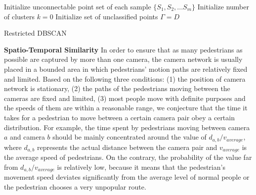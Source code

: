 \documentclass[10pt,twocolumn,letterpaper]{article}
\begin{document}
\begin{algorithm}
    \SetAlgoLined
        Initialize unconnectable point set of each sample $\{S_1, S_2, ... S_m\}$\;
        Initialize number of clusters $k = 0$\;
        Initialize set of unclassified points $\Gamma = D$\;
        \caption{Restricted DBSCAN}
    \label{alg:rdbscan}
\end{algorithm}

\noindent \textbf{Spatio-Temporal Similarity}
In order to ensure that as many pedestrians as possible are captured by more than one camera, the camera network is usually placed in a bounded area in which pedestrians' motion paths are relatively fixed and limited. Based on the following three conditions: (1) the position of camera network is stationary, (2) the paths of the pedestrians moving between the cameras are fixed and limited, (3) most people move with definite purposes and the speeds of them are within a reasonable range, we conjecture that the time it takes for a pedestrian to move between a certain camera pair obey a certain distribution. For example, the time spent by pedestrians moving between camera $a$ and camera $b$ should be mainly concentrated around the value of $d_{a,b}/v_{average}$, where $d_{a,b}$ represents the actual distance between the camera pair and $v_{average}$ is the average speed of pedestrians. On the contrary, the probability of the value far from $d_{a,b}/v_{average}$ is relatively low, because it means that the pedestrian's movement speed deviates significantly from the average level of normal people or the pedestrian chooses a very unpopular route.
\end{document}
